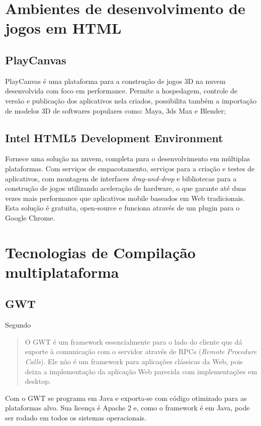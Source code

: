\chapter{Ambientes de desenvolvimento de jogos em HTML}

\section{PlayCanvas}

PlayCanvas é uma plataforma para a construção de jogos 3D
na nuvem desenvolvida com foco em performance. Permite a hospedagem,
controle de versão e publicação dos aplicativos nela criados,
possibilita também a importação de modelos 3D de softwares populares
como: Maya, 3ds Max e Blender;

\section{Intel HTML5 Development Environment}

Fornece uma solução na nuvem, completa para o desenvolvimento em
múltiplas plataformas. Com serviços de empacotamento, serviços
para a criação e testes de aplicativos, com montagem de interfaces
\textit{drag-and-drop} e bibliotecas para a construção de jogos
utilizando aceleração de hardware, o que garante até duas vezes mais
performance que aplicativos mobile baseados em Web tradicionais. Esta
solução é gratuita, open-source e funciona através de um plugin para
o Google Chrome.

\chapter{Tecnologias de Compilação multiplataforma}

\section{GWT}
Segundo \citet[p. 29]{gwt}
\begin{quote}
O GWT é um framework essencialmente para o lado do cliente que dá
suporte à comunicação com o servidor através de RPCs (\textit{Remote
Procedure Calls}). Ele não é um framework para aplicações clássicas
da Web, pois deixa a implementação da aplicação Web parecida com
implementações em desktop.
\end{quote}

Com o GWT se programa em Java e exporta-se com código otimizado para
as plataformas alvo. Sua licença é Apache 2 e, como o framework é em
Java, pode ser rodado em todos os sistemas operacionais.

